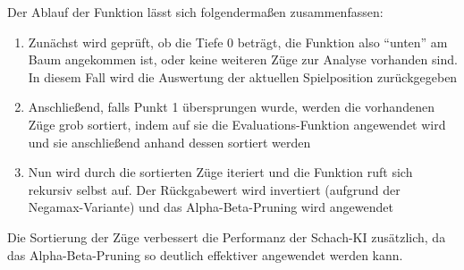 Der Ablauf der Funktion lässt sich folgendermaßen zusammenfassen:

\begin{enumerate}
    \item Zunächst wird geprüft, ob die Tiefe $0$ beträgt, die Funktion also "`unten"' am Baum angekommen ist, oder keine weiteren Züge zur Analyse vorhanden sind. In diesem Fall wird die Auswertung der aktuellen Spielposition zurückgegeben
    \item Anschließend, falls Punkt 1 übersprungen wurde, werden die vorhandenen Züge grob sortiert, indem auf sie die Evaluations-Funktion angewendet wird und sie anschließend anhand dessen sortiert werden
    \item Nun wird durch die sortierten Züge iteriert und die Funktion ruft sich rekursiv selbst auf. Der Rückgabewert wird invertiert (aufgrund der Negamax-Variante) und das Alpha-Beta-Pruning wird angewendet
\end{enumerate}

Die Sortierung der Züge verbessert die Performanz der Schach-KI zusätzlich, da das Alpha-Beta-Pruning so deutlich effektiver angewendet werden kann.